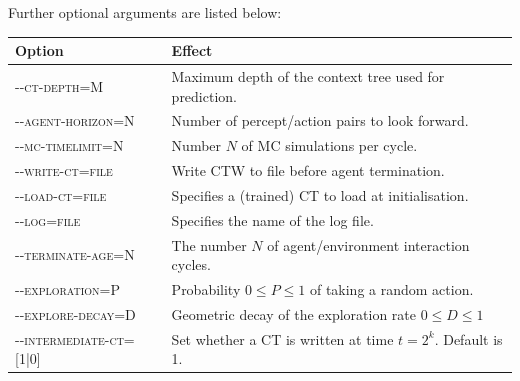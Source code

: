 \documentclass[paper=a4, fontsize=11pt]{scrartcl} %
\numberwithin{equation}{section} %
\numberwithin{figure}{section} %
\numberwithin{table}{section} %
\begin{document}
Further optional arguments are listed below:

\bigskip

\begin{tabular}{ll}
Option & Effect \\\hline
\textsc{-{}-ct-depth=M} & Maximum depth of the context tree used for prediction.\\
\textsc{-{}-agent-horizon=N} & Number of percept/action pairs to look forward.\\
\textsc{-{}-mc-timelimit=N} & Number $N$ of MC simulations per cycle.\\
\textsc{-{}-write-ct=file} & Write CTW to file before agent termination.\\
\textsc{-{}-load-ct=file} & Specifies a (trained) CT to load at initialisation.\\
\textsc{-{}-log=file} & Specifies the name of the log file.\\
\textsc{-{}-terminate-age=N} & The number $N$ of agent/environment interaction cycles.\\
\textsc{-{}-exploration=P} & Probability $0 \leq P \leq 1$ of taking a random action.\\
\textsc{-{}-explore-decay=D} & Geometric decay of the exploration rate $0 \leq D \leq 1$\\
\textsc{-{}-intermediate-ct=[1|0]} & Set whether a CT is written at time $t=2^k$. Default is 1.\\
\end{tabular}
\end{document}
